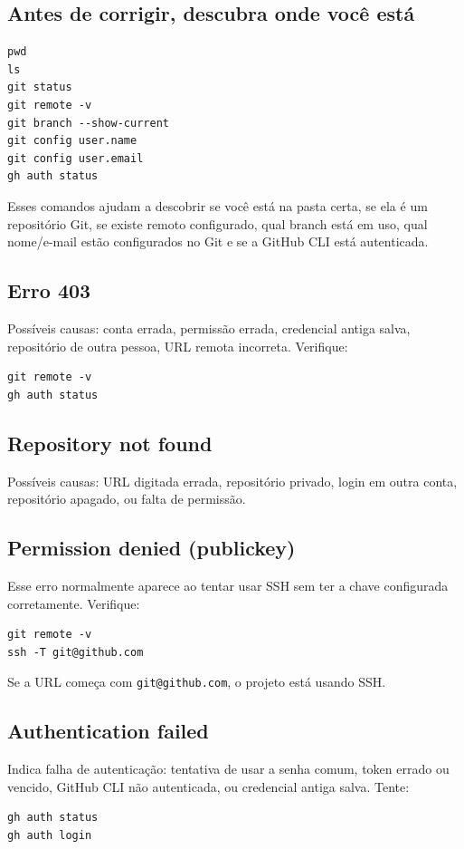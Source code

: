 \documentclass[11pt,a4paper]{article}
\begin{document}
\subsection*{Antes de corrigir, descubra onde você está}
\begin{lstlisting}
pwd
ls
git status
git remote -v
git branch --show-current
git config user.name
git config user.email
gh auth status
\end{lstlisting}
Esses comandos ajudam a descobrir se você está na pasta certa, se ela é um repositório Git, se existe remoto configurado, qual branch está em uso, qual nome/e-mail estão configurados no Git e se a GitHub CLI está autenticada.

\subsection*{Erro 403}
Possíveis causas: conta errada, permissão errada, credencial antiga salva, repositório de outra pessoa, URL remota incorreta. Verifique:
\begin{lstlisting}
git remote -v
gh auth status
\end{lstlisting}

\subsection*{Repository not found}
Possíveis causas: URL digitada errada, repositório privado, login em outra conta, repositório apagado, ou falta de permissão.

\subsection*{Permission denied (publickey)}
Esse erro normalmente aparece ao tentar usar SSH sem ter a chave configurada corretamente. Verifique:
\begin{lstlisting}
git remote -v
ssh -T git@github.com
\end{lstlisting}
Se a URL começa com \texttt{git@github.com}, o projeto está usando SSH.

\subsection*{Authentication failed}
Indica falha de autenticação: tentativa de usar a senha comum, token errado ou vencido, GitHub CLI não autenticada, ou credencial antiga salva. Tente:
\begin{lstlisting}
gh auth status
gh auth login
\end{lstlisting}
\end{document}
